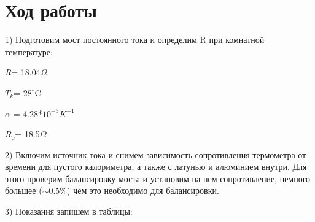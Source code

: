 \documentclass[a4paper,12pt]{article} %
\begin{document}
\section{Ход работы}
1) Подготовим мост постоянного тока и определим R при комнатной температуре:

\textit{R}= 18.04$\Omega$

$T_k$= $28^{\circ}$C

$\alpha$ = 4.28*$10^{-3} K^{-1}$

$R_0$= 18.5$\Omega$

2) Включим источник тока и снимем зависимость сопротивления термометра от времени для пустого калориметра, а также с латунью и алюминием внутри. Для этого проверим балансировку моста и установим на нем сопротивление, немного большее ($\sim$0.5\%) чем это необходимо для балансировки.

3) Показания запишем в таблицы:
\end{document}
